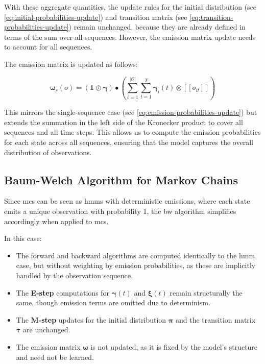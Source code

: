 With these aggregate quantities, the update rules for the initial distribution (see \autoref{eq:initial-probabilities-update}) and transition matrix (see \autoref{eq:transition-probabilities-update}) remain unchanged, because they are already defined in terms of the sum over all sequences.
However, the emission matrix update needs to account for all sequences.

The emission matrix is updated as follows:


\begin{equation}
    \pmb{\omega}
    _s(o) = (\mathbf{1} \oslash \pmb{\gamma}) \smblkcircle \left( \sum_{i=1}^{|\mathcal{O}|} \sum_{t=1}^{T} \pmb{\gamma}_i(t) \otimes [[o_{it}]] \right)
    \label{eq:omega-update}
\end{equation}


This mirrors the single-sequence case (see \autoref{eq:emission-probabilities-update}) but extends the summation in the left side of the Kronecker product to cover all sequences and all time steps.
This allows us to compute the emission probabilities for each state across all sequences, ensuring that the model captures the overall distribution of observations.

\subsection{Baum-Welch Algorithm for Markov Chains}\label{subsec:baum-welch-mc}
Since \glspl{mc} can be seen as \glspl{hmm} with deterministic emissions, where each state emits a unique observation with probability 1, the \gls{bw} algorithm simplifies accordingly when applied to \glspl{mc}.

In this case:

\begin{itemize}
    \item The forward and backward algorithms are computed identically to the \gls{hmm} case, but without weighting by emission probabilities, as these are implicitly handled by the observation sequence.
    \item The \textbf{E-step} computations for $\pmb{\gamma}(t)$ and $\pmb{\xi}(t)$ remain structurally the same, though emission terms are omitted due to determinism.
    \item The \textbf{M-step} updates for the initial distribution $\pmb{\pi}$ and the transition matrix $\pmb{\tau}$ are unchanged.
    \item The emission matrix $\pmb{\omega}$ is not updated, as it is fixed by the model's structure and need not be learned.
\end{itemize}

